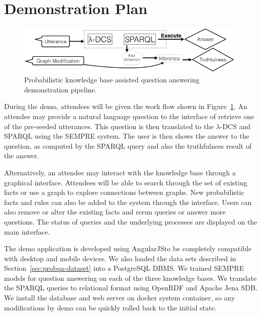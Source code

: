 
\section{Demonstration Plan}

\begin{figure}
\centering
 \includegraphics[width=0.9\linewidth]{images/probqa-pipeline.png}
 \caption{Probabilistic knowledge base assisted question answering demonstration pipeline.}
\label{fig:probqa-pipeline}
\end{figure}


During the demo, attendees will be given the work flow shown in Figure~\ref{fig:probqa-pipeline}.
An attendee may provide a natural language question to the interface of retrieve one of the pre-seeded utterances.
This question is then translated to the \(\lambda\)-DCS and SPARQL using the SEMPRE system.
The user is then shows the answer to the question, as computed by the SPARQL
query and also the truthfulness result of the answer.

Alternatively, an attendee may interact with the knowledge base through a graphical interface.
Attendees will be able to search through the set of existing facts or use a graph to explore connections between graphs.
New probabilistic facts and rules can also be added to the system through the interface.
Users can also remove or alter the existing facts and rerun queries or answer more questions.
The status of queries and the underlying processes are displayed on the main interface.









The demo application is developed using AngularJS\@ to be completely compatible with desktop and mobile devices.
We also loaded the data sets described in Section~\ref{sec:probqa-dataset} into a PostgreSQL DBMS\@.
We trained SEMPRE models for question answering on each of the three knowledge bases.
We translate the SPARQL queries to relational format using OpenRDF and Apache Jena SDB\@.
We install the database and web server on docker system container, so any modifications by demo can be quickly rolled back to the initial state.





